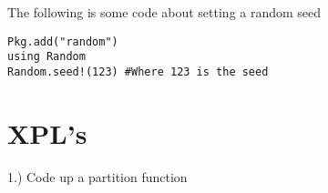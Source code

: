 The following is some code about setting a random seed
\begin{lstlisting}
Pkg.add("random")
using Random
Random.seed!(123) #Where 123 is the seed
\end{lstlisting}


\section{XPL's}
1.) Code up a partition function



